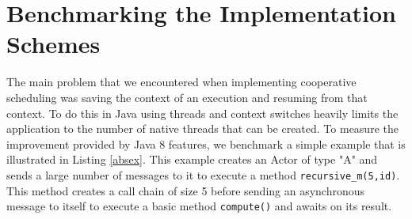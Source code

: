 \section{Benchmarking the Implementation Schemes}
\label{bench}
The main problem that we encountered when implementing cooperative scheduling was saving the context of an execution and resuming from that context. To do this in Java using threads and context switches heavily limits the application to the number of native threads that can be created. To measure the improvement provided by Java 8 features, we benchmark a simple example that is illustrated in Listing \ref{absex}. This example creates an Actor of type "A" and sends a large number of messages to it to execute a method \lstinline|recursive_m(5,id)|. This method creates a call chain of size 5 before sending an asynchronous message to itself to execute a basic method \lstinline|compute()| and awaits on its result.




